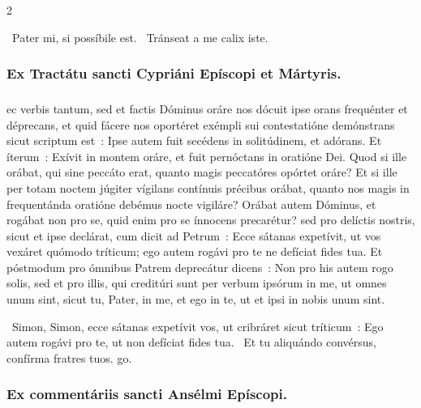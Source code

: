 \documentclass[9pt,twoside]{extarticle}
\begin{document}
\begin{multicols}{2}
\begin{tightlist}{}
\item {}~Pater mi, si possíbile est. ~Tránseat a me calix iste.
\end{tightlist}

\subsubsection*{\center Ex Tractátu sancti Cypriáni Epíscopi et Mártyris.}
\subsubsection*{\center {}}
ec verbis tantum, sed et factis Dóminus oráre nos dócuit ipse orans frequénter et déprecans, et quid fácere nos oportéret exémpli sui contestatióne demónstrans sicut scriptum est~: Ipse autem fuit secédens in solitúdinem, et adórans. Et íterum~: Exívit in montem oráre, et fuit pernóctans in oratióne Dei. Quod si ille orábat, qui sine peccáto erat, quanto magis peccatóres opórtet oráre? Et si ille per totam noctem júgiter vígilans contínuis précibus orábat, quanto nos magis in frequentánda oratióne debémus nocte vigiláre? Orábat autem Dóminus, et rogábat non pro se, quid enim pro se ínnocens precarétur? sed pro delíctis nostris, sicut et ipse declárat, cum dicit ad Petrum~: Ecce sátanas expetívit, ut vos vexáret quómodo tríticum; ego autem rogávi pro te ne defíciat fides tua. Et póstmodum pro ómnibus Patrem deprecátur dicens~: Non pro his autem rogo solis, sed et pro illis, qui creditúri sunt per verbum ipsórum in me, ut omnes unum sint, sicut tu, Pater, in me, et ego in te, ut et ipsi in nobis unum sint.

\begin{tightlist}{}
\item {}~Simon, Simon, ecce sátanas expetívit vos, ut cribráret sicut tríticum~: \textred{*} Ego autem rogávi pro te, ut non defíciat fides tua. ~Et tu aliquándo convérsus, confírma fratres tuos. go.
\end{tightlist}

\subsubsection*{\center Ex commentáriis sancti Ansélmi Epíscopi.}

\end{multicols}
\end{document}
